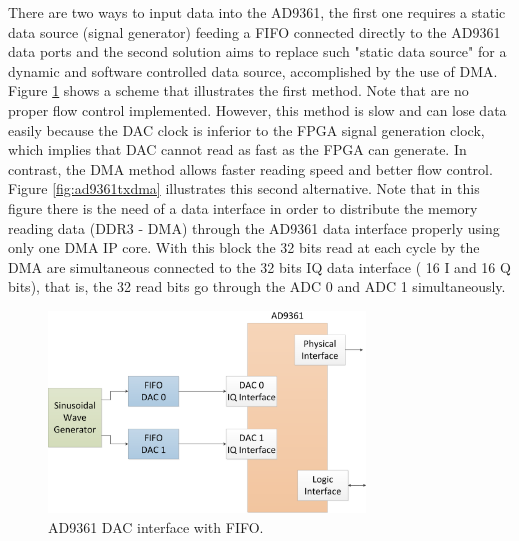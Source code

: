 
There are two ways to input data into the AD9361, the first one requires a
static data source (signal generator) feeding a FIFO connected directly to the
AD9361 data ports and the second solution aims to replace such "static data
source" for a dynamic and software controlled data source, accomplished by the
use of DMA. Figure \ref{fig:ad9361txfifo} shows a scheme that illustrates the
first method. Note that are no proper flow control implemented. However, this
method is slow and can lose data easily because the DAC clock is inferior to the
FPGA signal generation clock, which implies that DAC cannot read as fast as the
FPGA can generate. In contrast, the DMA method allows faster reading speed and
better flow control. Figure \ref{fig:ad9361txdma} illustrates this second
alternative. Note that in this figure there is the need of a data interface in
order to distribute the memory reading data (DDR3 - DMA) through the AD9361 data
interface properly using only one DMA IP core. With this block the 32 bits read
at each cycle by the DMA are simultaneous connected to the 32 bits IQ data
interface ( 16 I and 16 Q bits), that is, the 32 read bits go through the ADC 0
and ADC 1 simultaneously.


\begin{figure}[htbp]
    \centering
    \includegraphics[width=0.75\textwidth]{./figures/dac_fifo}
    \caption{ AD9361 DAC interface with FIFO.
    \label{fig:ad9361txfifo}}
\end{figure}

